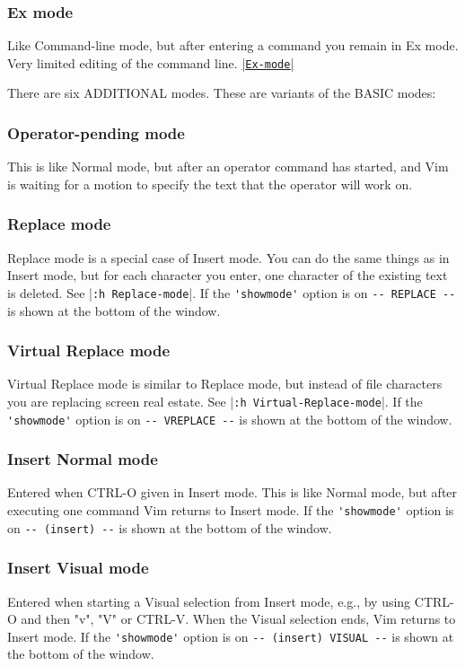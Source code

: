 \subsubsection{Ex mode}
Like Command-line mode, but after entering a command you remain in Ex mode.
Very limited editing of the command line.
\hyperref[Ex-mode]{|\texttt{Ex-mode}|}

There are six ADDITIONAL modes.  These are variants of the BASIC modes:


\subsubsection{Operator-pending mode}
\label{Operator-pending}
\label{Operator-pending-mode}
This is like Normal mode, but after an operator command has started, and Vim is waiting for a {motion} to specify the text that the operator will work on.

\subsubsection{Replace mode}
Replace mode is a special case of Insert mode.
You can do the same things as in Insert mode, but for each character you enter, one character of the existing text is deleted.
See |\verb!:h Replace-mode!|.
If the \verb!'showmode'! option is on \verb!-- REPLACE --! is shown at the bottom of the window.

\subsubsection{Virtual Replace mode}
Virtual Replace mode is similar to Replace mode, but instead of file characters you are replacing screen real estate.
See |\verb!:h Virtual-Replace-mode!|.
If the \verb!'showmode'! option is on \verb!-- VREPLACE --! is shown at the bottom of the window.

\subsubsection{Insert Normal mode}
Entered when CTRL-O given in Insert mode.
This is like Normal mode, but after executing one command Vim returns to Insert mode.
If the \verb!'showmode'! option is on \verb!-- (insert) --! is shown at the bottom of the window.

\subsubsection{Insert Visual mode}
Entered when starting a Visual selection from Insert mode, e.g., by using CTRL-O and then "v", "V" or CTRL-V.
When the Visual selection ends, Vim returns to Insert mode.
If the \verb!'showmode'! option is on \verb!-- (insert) VISUAL --! is shown at the bottom of the window.

